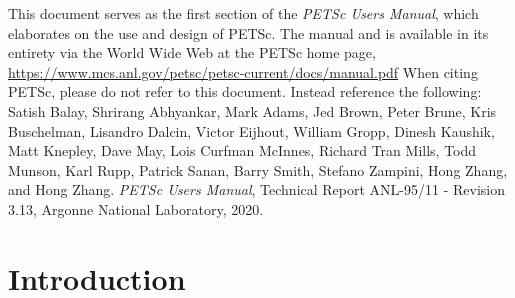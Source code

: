 

 This document serves as the first section of the {\em PETSc Users
Manual}, which elaborates on the use and design of PETSc. The
manual and is available in its entirety via the World Wide Web at
the PETSc home page,
\href{https://www.mcs.anl.gov/petsc/petsc-current/docs/manual.pdf}{https://www.mcs.anl.gov/petsc/petsc-current/docs/manual.pdf}
When citing PETSc, please do
not refer to this document. Instead reference the following: Satish
Balay, Shrirang Abhyankar, Mark Adams, Jed Brown, Peter Brune, Kris Buschelman, Lisandro Dalcin, Victor Eijhout, William Gropp, Dinesh Kaushik, Matt Knepley, Dave May,
Lois Curfman McInnes, Richard Tran Mills, Todd Munson, Karl Rupp, Patrick Sanan, Barry Smith, Stefano Zampini, Hong Zhang, and Hong Zhang.  {\em
PETSc Users Manual}, Technical Report ANL-95/11 - Revision 3.13,
Argonne National Laboratory, 2020.

%

\newpage
\section{Introduction}




